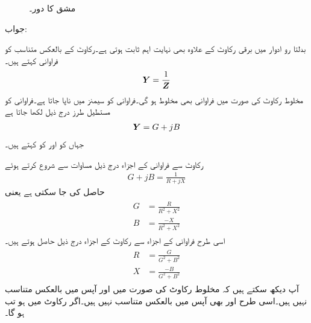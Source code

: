 \begin{figure}
\centering
{}
\caption{مشق  کا دور۔}
\label{شکل_بدلتا_متوازی_الف}
\end{figure} 

جواب:

بدلتا رو ادوار میں برقی رکاوٹ  کے علاوہ   بھی نہایت اہم ثابت ہوتی ہے۔رکاوٹ کے بالعکس متناسب کو فراوانی کہتے ہیں۔
\begin{align}
{\ensuremath{{\boldsymbol{Y}}}}=\frac{1}{{{\boldsymbol{Z}}}}
\end{align}
مخلوط رکاوٹ کی صورت میں فراوانی بھی مخلوط ہو گی۔فراوانی کو سیمنز  میں ناپا جاتا ہے۔فراوانی کو مستطیل طرز درج ذیل لکھا جاتا ہے
\begin{align}
{\ensuremath{{\boldsymbol{Y}}}}=G+jB
\end{align}
جہاں  کو  اور  کو  کہتے ہیں۔

رکاوٹ سے فراوانی کے اجزاء درج ذیل مساوات سے شروع کرتے ہوئے
\begin{align}
G+jB=\frac{1}{R+jX}
\end{align}
حاصل کی جا سکتی ہے یعنی
\begin{gather}
\begin{aligned}
G&=\frac{R}{R^2+X^2}\\
B&=\frac{-X}{R^2+X^2}
\end{aligned}
\end{gather}
اسی طرح فراوانی کے اجزاء سے رکاوٹ کے اجزاء درج ذیل حاصل ہوتے ہیں۔
\begin{gather}
\begin{aligned}
R&=\frac{G}{G^2+B^2}\\
X&=\frac{-B}{G^2+B^2}
\end{aligned}
\end{gather}
آپ دیکھ سکتے ہیں کہ مخلوط رکاوٹ کی صورت میں  اور  آپس میں بالعکس متناسب نہیں ہیں۔اسی طرح  اور  بھی آپس میں بالعکس متناسب نہیں ہیں۔اگر رکاوٹ میں  ہو تب  ہو گا۔

